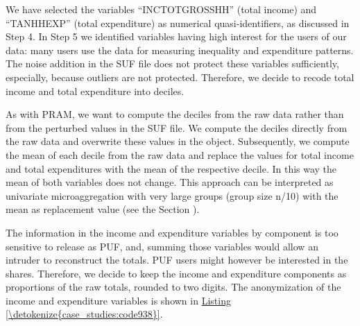 \documentclass[letterpaper,10pt,english]{sphinxmanual}
\begin{document}

We have selected the variables “INCTOTGROSSHH” (total income) and
“TANHHEXP” (total expenditure) as numerical quasi-identifiers, as
discussed in Step 4. In Step 5 we identified variables having high
interest for the users of our data: many users use the data for
measuring inequality and expenditure patterns. The noise addition in the
SUF file does not protect these variables sufficiently, especially,
because outliers are not protected. Therefore, we decide to recode total
income and total expenditure into deciles.

As with PRAM, we want to compute the deciles from the raw data rather
than from the perturbed values in the SUF file. We compute the deciles
directly from the raw data and overwrite these values in the 
object. Subsequently, we compute the mean of each decile from the raw
data and replace the values for total income and total expenditures with
the mean of the respective decile. In this way the mean of both
variables does not change. This approach can be interpreted as
univariate microaggregation with very large groups (group size n/10)
with the mean as replacement value (see the Section
).

The information in the income and expenditure variables by component is
too sensitive to release as PUF, and, summing those variables would
allow an intruder to reconstruct the totals. PUF users might however be
interested in the shares. Therefore, we decide to keep the income and
expenditure components as proportions of the raw totals, rounded to two
digits. The anonymization of the income and expenditure variables is
shown in \hyperref[\detokenize{case_studies:code938}]{Listing \ref{\detokenize{case_studies:code938}}}.
\end{document}
